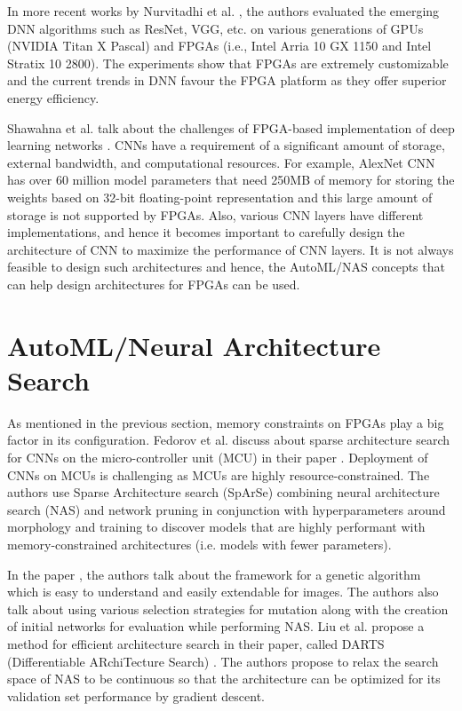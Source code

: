 In more recent works by Nurvitadhi et al. \cite{nurvitadhi2017can}, the authors evaluated the emerging DNN algorithms such as ResNet, VGG, etc. on various generations of GPUs (NVIDIA Titan X Pascal) and FPGAs (i.e., Intel Arria 10 GX 1150 and Intel Stratix 10 2800). The experiments show that FPGAs are extremely customizable and the current trends in DNN favour the FPGA platform as they offer superior energy efficiency. 

Shawahna et al. talk about the challenges of FPGA-based implementation of deep learning networks \cite{shawahna2018fpga}. CNNs have a requirement of a significant amount of storage, external bandwidth, and computational resources. For example, AlexNet CNN has over 60 million model parameters that need 250MB of memory for storing the weights based on 32-bit floating-point representation and this large amount of storage is not supported by FPGAs. Also, various CNN layers have different implementations, and hence it becomes important to carefully design the architecture of CNN to maximize the performance of CNN layers. It is not always feasible to design such architectures and hence, the AutoML/NAS concepts that can help design architectures for FPGAs can be used.

\section{AutoML/Neural Architecture Search}
\label{sec:autoML_NAS}

As mentioned in the previous section, memory constraints on FPGAs play a big factor in its configuration. Fedorov et al. discuss about sparse architecture search for CNNs on the micro-controller unit (MCU) in their paper \cite{NIPS2019_8743}. Deployment of CNNs on MCUs is challenging as MCUs are highly resource-constrained. The authors use Sparse Architecture search (SpArSe) combining neural architecture search (NAS) and network pruning in conjunction with hyperparameters around morphology and training to discover models that are highly performant with memory-constrained architectures (i.e. models with fewer parameters).

In the paper \cite{sun2020automatically}, the authors talk about the framework for a genetic algorithm which is easy to understand and easily extendable for images. The authors also talk about using various selection strategies for mutation along with the creation of initial networks for evaluation while performing NAS. Liu et al. propose a method for efficient architecture search in their paper, called DARTS (Differentiable ARchiTecture Search) \cite{liu2018darts}. The authors propose to relax the search space of NAS to be continuous so that the architecture can be optimized for its validation set performance by gradient descent. 


